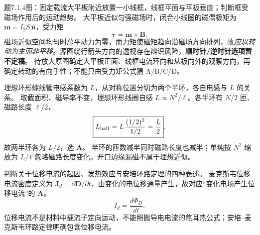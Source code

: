 \problemtext 题7.1.4图：固定载流大平板附近放置一小线框，线框平面与平板垂直；判断框受磁场作用后的运动趋势。
\workings 大平板近似匀强磁场时，闭合小线圈的磁偶极矩为 $\bm m=I_2S\,\hat{\bm n}$，受力矩
\[\boxed{\bm \tau=\bm m\times\bm B}.\]
磁场近似空间均匀时总平动力为零，而力矩使磁矩趋向沿磁场方向排列，故\emph{应以转动为主而非平移}。源图绕行箭头方向的透视存在辨识风险，\textbf{顺时针/逆时针选项暂不定稿}。
\crosscheck 待放大原图确定大平板正面、线框电流环向和从板向外的观察方向，再确定转动的有向手性；不能只由受力矩公式猜 A/B/C/D。

\problemtext 理想环形螺线管电感系数为 $L$，从对称位置分切为两个半环，各自电感与 $L$ 的关系。
\workings 取截面积、磁导率不变，理想环形线圈自感 $L\propto N^2/\ell$。各半环有 $N/2$ 匝、磁路长度 $\ell/2$，
\[\boxed{L_{\rm half}=L\,\frac{(1/2)^2}{1/2}=\frac L2}.\]
故两半环各为 $L/2$，选 \textbf{A}。
\crosscheck 半环的匝数减半同时磁路长度也减半；单纯按 $N^2$ 缩放为 $L/4$ 忽略磁路长度变化。开口边缘漏磁不属于理想近似。

\problemtext 判断关于位移电流的起因、发热效应与安培环路定理的四种表述。
\workings 麦克斯韦位移电流密度定义为 $\bm J_d=\partial\bm D/\partial t$，由变化的电位移通量产生，故对应“变化电场产生位移电流”的 \textbf{A}。
\[\boxed{I_d=\frac{d\Phi_D}{dt}}.\]
\crosscheck 位移电流不是材料中载流子定向运动，不能照搬导电电流的焦耳热公式；安培--麦克斯韦环路定律明确包含位移电流。
